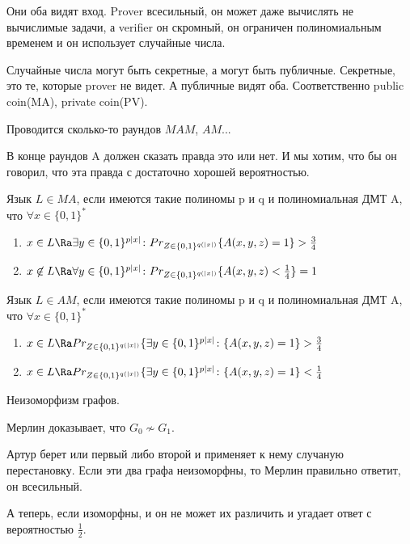 Они оба видят вход. Prover всесильный, он может даже вычислять не вычислимые задачи, а 
verifier он скромный, он ограничен полиномиальным временем и он использует случайные числа. 

Случайные числа могут быть секретные, а могут быть публичные. Секретные, это те, которые 
prover не видет. А публичные видят оба. Соответственно public coin(MA), private coin(PV).

Проводится сколько-то раундов $MAM$, $AM$... 

В конце раундов A должен сказать правда это или нет. И мы хотим, что бы 
он говорил, что эта правда с достаточно хорошей вероятностью. 

\begin{Def}
Язык $L \in MA$, если имеются такие полиномы p и q и 
полиномиальная ДМТ A, что $\forall x \in \{0, 1\}^*$\\
\begin{enumerate}
\item $x \in L \Ra \exists y \in \{0, 1\}^{p|x|} \colon Pr_{Z \in \{0, 1\}^{q(|x|)}} \{A(x, y, z) = 1\} > \frac{3}{4}$ \\
\item  $x \not \in L \Ra \forall y \in \{0, 1\}^{p|x|} \colon Pr_{Z \in \{0, 1\}^{q(|x|)}} \{A(x, y, z) < \frac{1}{4}\} = 1$ \\

\end{enumerate}

\end{Def}

\begin{Def}
Язык $L \in AM$, если имеются такие полиномы p и q и 
полиномиальная ДМТ A, что $\forall x \in \{0, 1\}^*$\\
\begin{enumerate}
\item $x \in L \Ra Pr_{Z \in \{0, 1\}^{q(|x|)}} \{\exists y \in \{0, 1\}^{p|x|} \colon  \{A(x, y, z) = 1\} > \frac{3}{4}$ \\
\item $x \in L \Ra Pr_{Z \in \{0, 1\}^{q(|x|)}} \{\exists y \in \{0, 1\}^{p|x|} \colon  \{A(x, y, z) = 1\} < \frac{1}{4}$ \\
\end{enumerate}

\end{Def}

\begin{exmp}
Неизоморфизм графов.

Мерлин доказывает, что $G_0 \not \sim G_1$.

Артур берет или первый либо второй и применяет к нему 
случаную перестановку. Если эти два графа неизоморфны, 
то Мерлин правильно ответит, он всесильный. 

А теперь, если изоморфны, и он не может их 
различить и угадает ответ с вероятностью $\frac{1}{2}$. 
\end{exmp}

